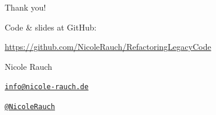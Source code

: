 
{
\begin{frame}{Thank you!}

        Code \& slides at GitHub:
        \begin{center}
                \url{https://github.com/NicoleRauch/RefactoringLegacyCode}
        \end{center}

        \begin{block}{Nicole Rauch}
        \begin{description}[Twitterxx]
                \item[E-Mail]  \href{mailto:info@nicole-rauch.de}{\texttt{info@nicole-rauch.de}}
                \item[Twitter] \href{http://twitter.com/NicoleRauch}{\texttt{@NicoleRauch}}
        \end{description}
        \end{block}
\end{frame}
}
